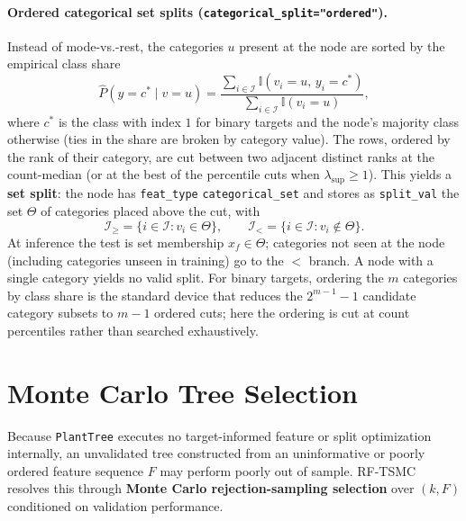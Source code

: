 \documentclass[11pt,a4paper]{article}
\newcommand{\code}[1]{\texttt{#1}}
\newcommand{\Ind}{\mathbb{I}}
\begin{document}
\paragraph{Ordered categorical set splits (\code{categorical\_split="ordered"}).}
Instead of mode-vs.-rest, the categories $u$ present at the node are sorted by the empirical class share
\begin{equation}
  \hat{P}(y = c^{\ast} \mid v = u) = \frac{\sum_{i \in \mathcal{I}} \Ind(v_i = u,\, y_i = c^{\ast})}{\sum_{i \in \mathcal{I}} \Ind(v_i = u)},
\end{equation}
where $c^{\ast}$ is the class with index $1$ for binary targets and the node's majority class otherwise (ties in the share are broken by category value). The rows, ordered by the rank of their category, are cut between two adjacent distinct ranks at the count-median (or at the best of the percentile cuts when $\lambda_{\text{sup}} \ge 1$). This yields a \textbf{set split}: the node has \code{feat\_type} \code{categorical\_set} and stores as \code{split\_val} the set $\Theta$ of categories placed above the cut, with
\begin{equation}
  \mathcal{I}_{\ge} = \{i \in \mathcal{I} : v_i \in \Theta\},
  \qquad
  \mathcal{I}_{<} = \{i \in \mathcal{I} : v_i \notin \Theta\}.
\end{equation}
At inference the test is set membership $x_f \in \Theta$; categories not seen at the node (including categories unseen in training) go to the $<$ branch. A node with a single category yields no valid split. For binary targets, ordering the $m$ categories by class share is the standard device that reduces the $2^{m-1} - 1$ candidate category subsets to $m - 1$ ordered cuts; here the ordering is cut at count percentiles rather than searched exhaustively.

\section{Monte Carlo Tree Selection}

Because \code{PlantTree} executes no target-informed feature or split optimization internally, an unvalidated tree constructed from an uninformative or poorly ordered feature sequence $F$ may perform poorly out of sample. RF-TSMC resolves this through \textbf{Monte Carlo rejection-sampling selection} over $(k, F)$ conditioned on validation performance.
\end{document}

